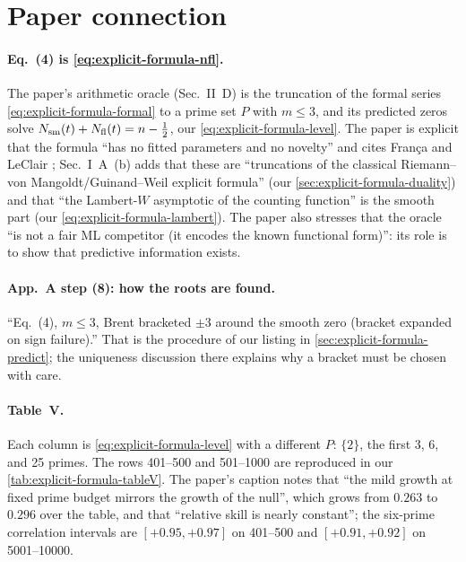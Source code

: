 \section{Paper connection}\label{sec:explicit-formula-paper}

\paragraph{Eq.~(4) is \cref{eq:explicit-formula-nfl}.} The paper's arithmetic oracle (Sec.~II~D) is the truncation of the formal series \cref{eq:explicit-formula-formal} to a prime set $P$ with $m\le3$, and its predicted zeros solve $N_{\mathrm{sm}}(t)+N_{\mathrm{fl}}(t)=n-\tfrac12$, our \cref{eq:explicit-formula-level}. The paper is explicit that the formula ``has no fitted parameters and no novelty'' and cites Fran\c{c}a and LeClair \cite{francaleclair,leclair}; Sec.~I~A~(b) adds that these are ``truncations of the classical Riemann--von Mangoldt/Guinand--Weil explicit formula'' (our \cref{sec:explicit-formula-duality}) and that ``the Lambert-$W$ asymptotic of the counting function'' is the smooth part (our \cref{eq:explicit-formula-lambert}). The paper also stresses that the oracle ``is not a fair ML competitor (it encodes the known functional form)'': its role is to show that predictive information exists.

\paragraph{App.~A step (8): how the roots are found.} ``Eq.~(4), $m\le3$, Brent bracketed $\pm3$ around the smooth zero (bracket expanded on sign failure).'' That is the procedure of our listing in \cref{sec:explicit-formula-predict}; the uniqueness discussion there explains why a bracket must be chosen with care.

\paragraph{Table~V.} Each column is \cref{eq:explicit-formula-level} with a different $P$: $\{2\}$, the first 3, 6, and 25 primes. The rows 401--500 and 501--1000 are reproduced in our \cref{tab:explicit-formula-tableV}. The paper's caption notes that ``the mild growth at fixed prime budget mirrors the growth of the null'', which grows from $0.263$ to $0.296$ over the table, and that ``relative skill is nearly constant''; the six-prime correlation intervals are $[+0.95,+0.97]$ on 401--500 and $[+0.91,+0.92]$ on 5001--10000.

